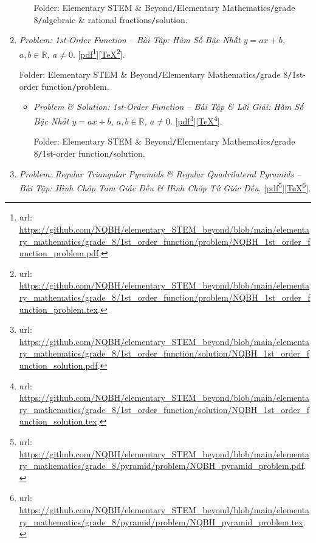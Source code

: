 \documentclass[12pt,twoside]{book}
\begin{document}
\begin{enumerate}
\begin{itemize}
		Folder: {\sf Elementary STEM \& Beyond{\tt/}Elementary Mathematics{\tt/}grade 8{\tt/}algebraic \& rational fractions{\tt/}solution}.
	\end{itemize}
	\item {\it Problem: 1st-Order Function -- Bài Tập: Hàm Số Bậc Nhất $y = ax + b$, $a,b\in\mathbb{R}$, $a\ne0$}. [\href{https://github.com/NQBH/elementary_STEM_beyond/blob/main/elementary_mathematics/grade_8/1st_order_function/problem/NQBH_1st_order_function_problem.pdf}{pdf}\footnote{{\sc url}: \url{https://github.com/NQBH/elementary_STEM_beyond/blob/main/elementary_mathematics/grade_8/1st_order_function/problem/NQBH_1st_order_function_problem.pdf}.}][\href{https://github.com/NQBH/elementary_STEM_beyond/blob/main/elementary_mathematics/grade_8/1st_order_function/problem/NQBH_1st_order_function_problem.tex}{\TeX}\footnote{{\sc url}: \url{https://github.com/NQBH/elementary_STEM_beyond/blob/main/elementary_mathematics/grade_8/1st_order_function/problem/NQBH_1st_order_function_problem.tex}.}].
	
	Folder: {\sf Elementary STEM \& Beyond{\tt/}Elementary Mathematics{\tt/}grade 8{\tt/}1st-order function{\tt/}problem}.
	\begin{itemize}
		\item {\it Problem \& Solution: 1st-Order Function -- Bài Tập \& Lời Giải: Hàm Số Bậc Nhất $y = ax + b$, $a,b\in\mathbb{R}$, $a\ne0$}. [\href{https://github.com/NQBH/elementary_STEM_beyond/blob/main/elementary_mathematics/grade_8/1st_order_function/solution/NQBH_1st_order_function_solution.pdf}{pdf}\footnote{{\sc url}: \url{https://github.com/NQBH/elementary_STEM_beyond/blob/main/elementary_mathematics/grade_8/1st_order_function/solution/NQBH_1st_order_function_solution.pdf}.}][\href{https://github.com/NQBH/elementary_STEM_beyond/blob/main/elementary_mathematics/grade_8/1st_order_function/solution/NQBH_1st_order_function_solution.tex}{\TeX}\footnote{{\sc url}: \url{https://github.com/NQBH/elementary_STEM_beyond/blob/main/elementary_mathematics/grade_8/1st_order_function/solution/NQBH_1st_order_function_solution.tex}.}].
		
		Folder: {\sf Elementary STEM \& Beyond{\tt/}Elementary Mathematics{\tt/}grade 8{\tt/}1st-order function{\tt/}solution}.
	\end{itemize}
	\item {\it Problem: Regular Triangular Pyramids {\it\&} Regular Quadrilateral Pyramids -- Bài Tập: Hình Chóp Tam Giác Đều {\it\&} Hình Chóp Tứ Giác Đều}. [\href{https://github.com/NQBH/elementary_STEM_beyond/blob/main/elementary_mathematics/grade_8/pyramid/problem/NQBH_pyramid_problem.pdf}{pdf}\footnote{{\sc url}: \url{https://github.com/NQBH/elementary_STEM_beyond/blob/main/elementary_mathematics/grade_8/pyramid/problem/NQBH_pyramid_problem.pdf}.}][\href{https://github.com/NQBH/elementary_STEM_beyond/blob/main/elementary_mathematics/grade_8/pyramid/problem/NQBH_pyramid_problem.tex}{\TeX}\footnote{{\sc url}: \url{https://github.com/NQBH/elementary_STEM_beyond/blob/main/elementary_mathematics/grade_8/pyramid/problem/NQBH_pyramid_problem.tex}.}].
	

\end{enumerate}
\end{document}
